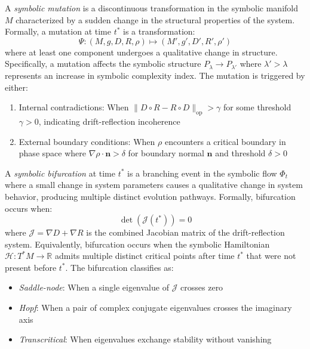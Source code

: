 \begin{definition}
\label{definition:bk6_symbolic_mutation}
A \emph{symbolic mutation} is a discontinuous transformation in the symbolic manifold $M$ characterized by a sudden change in the structural properties of the system. Formally, a mutation at time $t^*$ is a transformation:
\begin{equation}
\Psi: (M, g, D, R, \rho) \mapsto (M', g', D', R', \rho')
\end{equation}
where at least one component undergoes a qualitative change in structure. Specifically, a mutation affects the symbolic structure $P_\lambda \to P_{\lambda'}$ where $\lambda' > \lambda$ represents an increase in symbolic complexity index.
The mutation is triggered by either:
\begin{enumerate}
\item Internal contradictions: When $\|D \circ R - R \circ D\|_{\text{op}} > \gamma$ for some threshold $\gamma > 0$, indicating drift-reflection incoherence
\item External boundary conditions: When $\rho$ encounters a critical boundary in phase space where $\nabla \rho \cdot \mathbf{n} > \delta$ for boundary normal $\mathbf{n}$ and threshold $\delta > 0$
\end{enumerate}
\end{definition}
\begin{definition}
\label{definition:bk6_symbolic_bifurcation}
A \emph{symbolic bifurcation} at time $t^*$ is a branching event in the symbolic flow $\Phi_t$ where a small change in system parameters causes a qualitative change in system behavior, producing multiple distinct evolution pathways. Formally, bifurcation occurs when:
\begin{equation}
\det(\mathcal{J}(t^*)) = 0
\end{equation}
where $\mathcal{J} = \nabla D + \nabla R$ is the combined Jacobian matrix of the drift-reflection system. Equivalently, bifurcation occurs when the symbolic Hamiltonian $\mathcal{H}: T^*M \rightarrow \mathbb{R}$ admits multiple distinct critical points after time $t^*$ that were not present before $t^*$.
The bifurcation classifies as:
\begin{itemize}
\item \emph{Saddle-node}: When a single eigenvalue of $\mathcal{J}$ crosses zero
\item \emph{Hopf}: When a pair of complex conjugate eigenvalues crosses the imaginary axis
\item \emph{Transcritical}: When eigenvalues exchange stability without vanishing
\end{itemize}
\end{definition}
